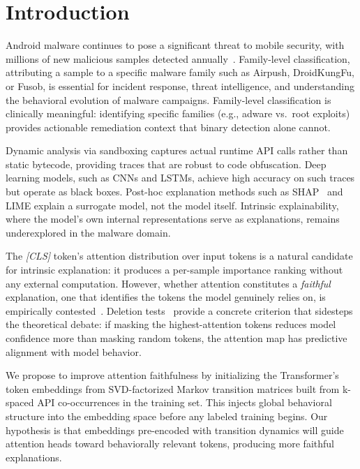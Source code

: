 \documentclass[12pt]{article}
\begin{document}
\section{Introduction}

Android malware continues to pose a significant threat to mobile security,
with millions of new malicious samples detected annually~\citep{av_test_2023}.
Family-level classification, attributing a sample to a specific malware
family such as Airpush, DroidKungFu, or Fusob, is essential for incident
response, threat intelligence, and understanding the behavioral evolution
of malware campaigns. Family-level classification is clinically meaningful:
identifying specific families (e.g., adware vs.\ root exploits) provides
actionable remediation context that binary detection alone cannot.

Dynamic analysis via sandboxing captures actual runtime API calls rather
than static bytecode, providing traces that are robust to code obfuscation.
Deep learning models, such as CNNs and LSTMs, achieve
high accuracy on such traces but operate as black boxes. Post-hoc
explanation methods such as SHAP~\citep{lundberg2017shap} and LIME
explain a surrogate model, not the model itself. Intrinsic
explainability, where the model's own internal representations serve
as explanations, remains underexplored in the malware domain.

The \textit{[CLS]} token's attention distribution over input tokens
is a natural candidate for intrinsic explanation: it produces a
per-sample importance ranking without any external computation.
However, whether attention constitutes a \textit{faithful}
explanation, one that identifies the tokens the model genuinely
relies on, is empirically contested~\citep{jain2019attention,
wiegreffe2019attention}. Deletion tests~\citep{samek2017evaluating}
provide a concrete criterion that sidesteps the theoretical debate:
if masking the highest-attention tokens reduces model confidence
more than masking random tokens, the attention map has predictive
alignment with model behavior.

We propose to improve attention faithfulness by initializing the
Transformer's token embeddings from SVD-factorized Markov transition
matrices built from k-spaced API co-occurrences in the training set.
This injects global behavioral structure into the embedding space
before any labeled training begins. Our hypothesis is that embeddings
pre-encoded with transition dynamics will guide attention heads toward
behaviorally relevant tokens, producing more faithful explanations.
\end{document}
